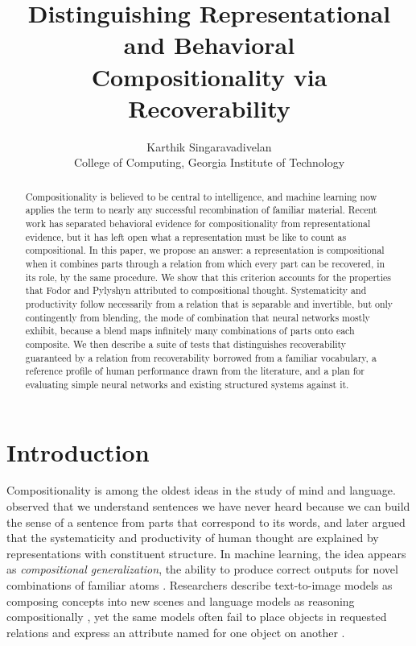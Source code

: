 \documentclass{article}
\title{Distinguishing Representational and Behavioral\\ Compositionality via Recoverability}
\author{Karthik Singaravadivelan\\ College of Computing, Georgia Institute of Technology}
\theoremstyle{definition}
\theoremstyle{plain}
\theoremstyle{remark}
\begin{document}
\maketitle

\begin{abstract}
Compositionality is believed to be central to intelligence, and
machine learning now applies the term to nearly any successful
recombination of familiar material. Recent work has separated
behavioral evidence for compositionality from representational
evidence, but it has left open what a representation must be like to
count as compositional. In this paper, we propose an answer: a
representation is compositional when it combines parts through a
relation from which every part can be recovered, in its role, by the
same procedure. We show that this criterion accounts for the
properties that Fodor and Pylyshyn attributed to compositional
thought. Systematicity and productivity follow necessarily from a
relation that is separable and invertible, but only contingently from
blending, the mode of combination that neural networks mostly exhibit,
because a blend maps infinitely many combinations of parts onto each
composite. We then describe a suite of tests that distinguishes
recoverability guaranteed by a relation from recoverability borrowed
from a familiar vocabulary, a reference profile of human performance
drawn from the literature, and a plan for evaluating simple neural
networks and existing structured systems against it.
\end{abstract}

\section{Introduction}
\label{sec:intro}

Compositionality is among the oldest ideas in the study of mind and
language. \citet{frege1923} observed that we understand sentences we
have never heard because we can build the sense of a sentence from
parts that correspond to its words, and \citet{fodor1988} later argued
that the systematicity and productivity of human thought are explained
by representations with constituent structure. In machine learning,
the idea appears as {\it compositional generalization\/}, the ability
to produce correct outputs for novel combinations of familiar atoms
\citep{lake2018,keysers2020}. Researchers describe text-to-image models
as composing concepts into new scenes \citep{ramesh2021,okawa2023} and
language models as reasoning compositionally \citep{press2023}, yet the
same models often fail to place objects in requested relations
\citep{conwell2022} and express an attribute named for one object on
another \citep{rassin2022}.
\end{document}
